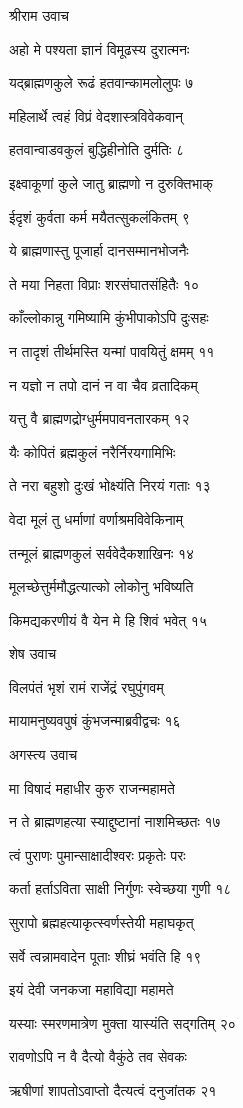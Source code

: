 श्रीराम उवाच

अहो मे पश्यता ज्ञानं विमूढस्य दुरात्मनः

यद्ब्राह्मणकुले रूढं हतवान्कामलोलुपः ७

महिलार्थे त्वहं विप्रं वेदशास्त्रविवेकवान्

हतवान्वाडवकुलं बुद्धिहीनोति दुर्मतिः ८

इक्ष्वाकूणां कुले जातु ब्राह्मणो न दुरुक्तिभाक्

ईदृशं कुर्वता कर्म मयैतत्सुकलंकितम् ९

ये ब्राह्मणास्तु पूजार्हा दानसम्मानभोजनैः

ते मया निहता विप्राः शरसंघातसंहितैः १०

काँल्लोकान्नु गमिष्यामि कुंभीपाकोऽपि दुःसहः

न तादृशं तीर्थमस्ति यन्मां पावयितुं क्षमम् ११

न यज्ञो न तपो दानं न वा चैव व्रतादिकम्

यत्तु वै ब्राह्मणद्रोग्धुर्ममपावनतारकम् १२

यैः कोपितं ब्रह्मकुलं नरैर्निरयगामिभिः

ते नरा बहुशो दुःखं भोक्ष्यंति निरयं गताः १३

वेदा मूलं तु धर्माणां वर्णाश्रमविवेकिनाम्

तन्मूलं ब्राह्मणकुलं सर्ववेदैकशाखिनः १४

मूलच्छेत्तुर्ममौद्धत्यात्को लोकोनु भविष्यति

किमद्यकरणीयं वै येन मे हि शिवं भवेत् १५

शेष उवाच

विलपंतं भृशं रामं राजेंद्रं रघुपुंगवम्

मायामनुष्यवपुषं कुंभजन्माब्रवीद्वचः १६

अगस्त्य उवाच

मा विषादं महाधीर कुरु राजन्महामते

न ते ब्राह्मणहत्या स्याद्दुष्टानां नाशमिच्छतः १७

त्वं पुराणः पुमान्साक्षादीश्वरः प्रकृतेः परः

कर्ता हर्ताऽविता साक्षी निर्गुणः स्वेच्छया गुणी १८

सुरापो ब्रह्महत्याकृत्स्वर्णस्तेयी महाघकृत्

सर्वे त्वन्नामवादेन पूताः शीघ्रं भवंति हि १९

इयं देवी जनकजा महाविद्या महामते

यस्याः स्मरणमात्रेण मुक्ता यास्यंति सद्गतिम् २०

रावणोऽपि न वै दैत्यो वैकुंठे तव सेवकः

ऋषीणां शापतोऽवाप्तो दैत्यत्वं दनुजांतक २१

